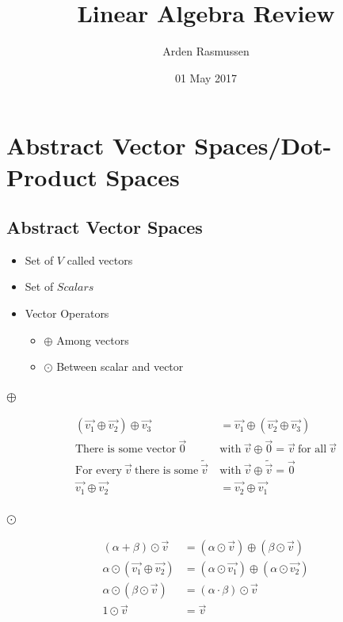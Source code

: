\documentclass[12pt]{article}
\title{Linear Algebra Review}
\author{Arden Rasmussen}
\date{01 May 2017}
\begin{document}
\maketitle
\newpage
\tableofcontents
\newpage
{}
\section{Abstract Vector Spaces/Dot-Product Spaces}\label{a}
\subsection{Abstract Vector Spaces}\label{a:a}
\begin{itemize}
  \item Set of $V$ called vectors
  \item Set of $Scalars$
  \item Vector Operators
  \begin{itemize}
    \item $\oplus$ Among vectors
    \item $\odot$ Between scalar and vector
  \end{itemize}
\end{itemize}
\subsubsection{$\oplus$}\label{a:a:p}
\begin{align}
  \left(\vec{v_1}\oplus\vec{v_2}\right)\oplus\vec{v_3} &= \vec{v_1}\oplus\left(\vec{v_2}\oplus\vec{v_3}\right)\\
  \text{There is some vector}\ \vec{0}\ &\text{with}\ \vec{v}\oplus\vec{0}=\vec{v}\ \text{for all}\ \vec{v}\\
  \text{For every}\ \vec{v}\ \text{there is some}\ \widetilde{\vec{v}}\ &\text{with}\ \vec{v}\oplus\widetilde{\vec{v}}=\vec{0}\\
  \vec{v_1}\oplus\vec{v_2}&=\vec{v_2}\oplus\vec{v_1}
\end{align}
\subsubsection{$\odot$}\label{a:a:d}
\begin{align}
  \left( \alpha + \beta \right) \odot \vec{v} &= \left( \alpha \odot \vec{v} \right) \oplus \left( \beta \odot \vec{v} \right)\\
  \alpha \odot \left( \vec{v_1} \oplus \vec{v_2} \right) &= \left( \alpha \odot \vec{v_1} \right) \oplus \left( \alpha \odot \vec{v_2} \right)\\
  \alpha \odot \left( \beta \odot \vec{v} \right) &= \left( \alpha \cdot \beta \right) \odot \vec{v}\\
  1 \odot \vec{v} &= \vec{v}
\end{align}
\end{document}
